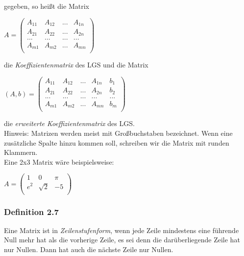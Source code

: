 \documentclass{article}
\begin{document}
gegeben, so heißt die Matrix \\
\begin{center}
    $A = \begin{pmatrix}
        A_{11} & A_{12} & ... & A_{1n} \\
        A_{21} & A_{22} & ... & A_{2n} \\
        ... & ... & ... & ... \\
        A_{m1} & A_{m2} & ... & A_{mn} \\
    \end{pmatrix}$
\end{center}
die \textit{Koeffizientenmatrix} des LGS und die Matrix \\
\begin{center}
    $(A,b) = \begin{pmatrix}
        A_{11} & A_{12} & ... & A_{1n} & b_1 \\
        A_{21} & A_{22} & ... & A_{2n} & b_2 \\
        ... & ... & ... & ... & ... \\
        A_{m1} & A_{m2} & ... & A_{mn} & b_m \\
    \end{pmatrix}$
\end{center}
die \textit{erweiterte Koeffizientenmatrix} des LGS. \\
Hinweis: Matrizen werden meist mit Großbuchstaben bezeichnet. Wenn eine zusätzliche Spalte hinzu kommen soll, schreiben wir die Matrix mit runden Klammern. \\
Eine 2x3 Matrix wäre beispielsweise: 
\begin{center}
    $A = \begin{pmatrix}
        1 & 0 & \pi \\
        e^2 & \sqrt{2} & -5 \\
    \end{pmatrix}$
\end{center}

\subsubsection*{Definition 2.7}
Eine Matrix ist in \textit{Zeilenstufenform}, wenn jede Zeile mindestens eine führende Null mehr hat als die vorherige Zeile, 
es sei denn die darüberliegende Zeile hat nur Nullen. Dann hat auch die nächste Zeile nur Nullen.
\end{document}
